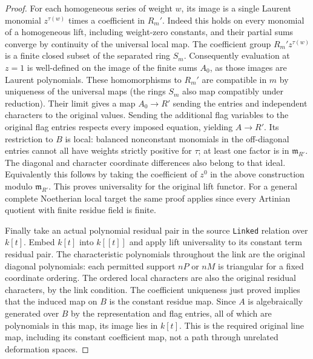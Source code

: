 \begin{proof}
For each homogeneous series of weight $w$, its
image is a single Laurent monomial $z^{\tau(w)}$
times a coefficient in $R_m'$. Indeed this holds
on every monomial of a homogeneous lift, including
weight-zero constants, and their partial sums
converge by continuity of the universal local map.
The coefficient group $R_m' z^{\tau(w)}$ is a finite
closed subset of the separated ring $S_m$.
Consequently evaluation at $z=1$ is well-defined
on the image of the finite sums $A_0$, as those
images are Laurent polynomials. These homomorphisms
to $R_m'$ are compatible in $m$ by uniqueness of
the universal maps (the rings $S_m$ also map
compatibly under reduction). Their limit gives a
map $A_0\to R'$ sending the entries and independent
characters to the original values. Sending the
additional flag variables to the original flag
entries respects every imposed equation, yielding
$A\to R'$. Its restriction to $B$ is local: balanced
nonconstant monomials in the off-diagonal entries
cannot all have weights strictly positive for
$\tau$; at least one factor is in $\mathfrak m_{R'}$.
The diagonal and character coordinate differences
also belong to that ideal. Equivalently this follows
by taking the coefficient of $z^0$ in the above
construction modulo $\mathfrak m_{R'}$.
This proves universality for the original lift
functor. For a general complete Noetherian local
target the same proof applies since every Artinian
quotient with finite residue field is finite.

Finally take an actual polynomial residual pair
in the source \texttt{Linked} relation over $k[t]$.
Embed $k[t]$ into $k[[t]]$ and apply lift universality
to its constant term residual pair. The characteristic
polynomials throughout the link are the original
diagonal polynomials: each permitted support $nP$
or $nM$ is triangular for a fixed coordinate ordering.
The ordered local characters are also the original
residual characters, by the link condition.
The coefficient uniqueness just proved implies
that the induced map on $B$ is the constant residue
map. Since $A$ is algebraically generated over $B$
by the representation and flag entries, all of which
are polynomials in this map, its image lies in $k[t]$.
This is the required original line map, including
its constant coefficient map, not a path through
unrelated deformation spaces.
\end{proof}

